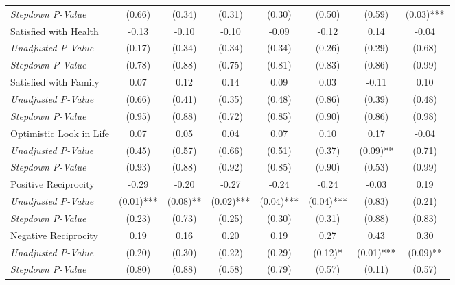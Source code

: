 \begin{tabular}{l c c c c c c c}
\quad \textit{Stepdown P-Value} & (0.66) & (0.34) & (0.31) & (0.30) & (0.50) & (0.59) & (0.03)*** \\
Satisfied with Health & -0.13 & -0.10 & -0.10 & -0.09 & -0.12 & 0.14 & -0.04 \\
\quad \textit{Unadjusted P-Value} & (0.17) & (0.34) & (0.34) & (0.34) & (0.26) & (0.29) & (0.68) \\
\quad \textit{Stepdown P-Value} & (0.78) & (0.88) & (0.75) & (0.81) & (0.83) & (0.86) & (0.99) \\
Satisfied with Family & 0.07 & 0.12 & 0.14 & 0.09 & 0.03 & -0.11 & 0.10 \\
\quad \textit{Unadjusted P-Value} & (0.66) & (0.41) & (0.35) & (0.48) & (0.86) & (0.39) & (0.48) \\
\quad \textit{Stepdown P-Value} & (0.95) & (0.88) & (0.72) & (0.85) & (0.90) & (0.86) & (0.98) \\
Optimistic Look in Life & 0.07 & 0.05 & 0.04 & 0.07 & 0.10 & 0.17 & -0.04 \\
\quad \textit{Unadjusted P-Value} & (0.45) & (0.57) & (0.66) & (0.51) & (0.37) & (0.09)** & (0.71) \\
\quad \textit{Stepdown P-Value} & (0.93) & (0.88) & (0.92) & (0.85) & (0.90) & (0.53) & (0.99) \\
Positive Reciprocity & -0.29 & -0.20 & -0.27 & -0.24 & -0.24 & -0.03 & 0.19 \\
\quad \textit{Unadjusted P-Value} & (0.01)*** & (0.08)** & (0.02)*** & (0.04)*** & (0.04)*** & (0.83) & (0.21) \\
\quad \textit{Stepdown P-Value} & (0.23) & (0.73) & (0.25) & (0.30) & (0.31) & (0.88) & (0.83) \\
Negative Reciprocity & 0.19 & 0.16 & 0.20 & 0.19 & 0.27 & 0.43 & 0.30 \\
\quad \textit{Unadjusted P-Value} & (0.20) & (0.30) & (0.22) & (0.29) & (0.12)* & (0.01)*** & (0.09)** \\
\quad \textit{Stepdown P-Value} & (0.80) & (0.88) & (0.58) & (0.79) & (0.57) & (0.11) & (0.57) \\
\bottomrule
\end{tabular}
